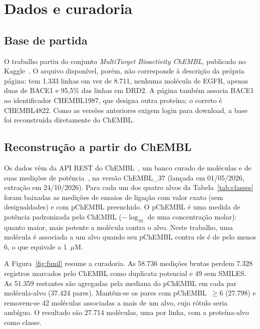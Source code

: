 \section{Dados e curadoria}

\subsection{Base de partida}

O trabalho partiu do conjunto \emph{MultiTarget Bioactivity ChEMBL}, publicado no Kaggle~\cite{kaggle:multitarget}. O arquivo disponível, porém, não corresponde à descrição da própria página: tem 1.333 linhas em vez de 8.711, nenhuma molécula de EGFR, apenas duas de BACE1 e 95,5\% das linhas em DRD2. A página também associa BACE1 ao identificador CHEMBL1987, que designa outra proteína; o correto é CHEMBL4822. Como as versões anteriores exigem login para download, a base foi reconstruída diretamente do ChEMBL.

\subsection{Reconstrução a partir do ChEMBL}

Os dados vêm da API REST do ChEMBL~\cite{davies:15}, um banco curado de moléculas e de suas medições de potência~\cite{gaulton:12,zdrazil:24}, na versão ChEMBL\_37 (lançada em 01/05/2026, extração em 24/10/2026). Para cada um dos quatro alvos da Tabela~\ref{tab:classes} foram baixadas as medições de ensaios de ligação com valor exato (sem desigualdades) e com pChEMBL preenchido. O pChEMBL é uma medida de potência padronizada pelo ChEMBL ($-\log_{10}$ de uma concentração molar): quanto maior, mais potente a molécula contra o alvo. Neste trabalho, uma molécula é associada a um alvo quando seu pChEMBL contra ele é de pelo menos 6, o que equivale a 1~$\mu$M.

A Figura~\ref{fig:funil} resume a curadoria. As 58.736 medições brutas perdem 7.328 registros marcados pelo ChEMBL como duplicata potencial e 49 sem SMILES. As 51.359 restantes são agregadas pela mediana do pChEMBL em cada par molécula-alvo (37.424 pares). Mantêm-se os pares com pChEMBL~$\geq 6$ (27.798) e removem-se 42 moléculas associadas a mais de um alvo, cujo rótulo seria ambíguo. O resultado são 27.714 moléculas, uma por linha, com a proteína-alvo como classe.

